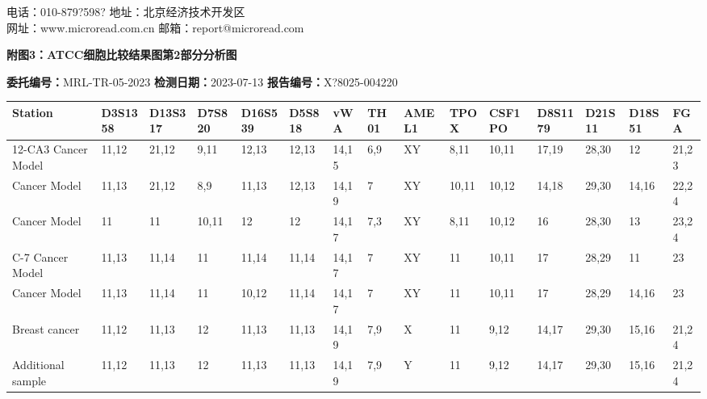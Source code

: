 \documentclass[UTF8,10pt,a4paper,fontset=fandol]{ctexart}
\begin{document}
\noindent 电话：010-879?598? \quad 地址：北京经济技术开发区\\
\noindent 网址：www.microread.com.cn \quad 邮箱：report@microread.com

\newpage

\begin{center}
\textbf{附图3：ATCC细胞比较结果图第2部分分析图}
\end{center}

\noindent
\textbf{委托编号：}MRL-TR-05-2023
\hfill
\textbf{检测日期：}2023-07-13
\hfill
\textbf{报告编号：}X?8025-004220

\medskip

\begin{center}
\scriptsize
\begin{tabular}{p{3.0cm}*{14}{p{0.72cm}}}
\hline
\textbf{Station}
& \textbf{D3S1358}
& \textbf{D13S317}
& \textbf{D7S820}
& \textbf{D16S539}
& \textbf{D5S818}
& \textbf{vWA}
& \textbf{TH01}
& \textbf{AMEL1}
& \textbf{TPOX}
& \textbf{CSF1PO}
& \textbf{D8S1179}
& \textbf{D21S11}
& \textbf{D18S51}
& \textbf{FGA}
\\
\hline
12-CA3 Cancer Model
& 11,12 & 21,12 & 9,11 & 12,13 & 12,13
& 14,15 & 6,9 & XY & 8,11 & 10,11
& 17,19 & 28,30 & 12 & 21,23
\\
\multicolumn{1}{p{3.0cm}}{Cancer Model}
& 11,13 & 21,12 & 8,9 & 11,13 & 12,13
& 14,19 & 7 & XY & 10,11 & 10,12
& 14,18 & 29,30 & 14,16 & 22,24
\\
\multicolumn{1}{p{3.0cm}}{Cancer Model}
& 11 & 11 & 10,11 & 12 & 12
& 14,17 & 7,3 & XY & 8,11 & 10,12
& 16 & 28,30 & 13 & 23,24
\\
\multicolumn{1}{p{3.0cm}}{C-7 Cancer Model}
& 11,13 & 11,14 & 11 & 11,14 & 11,14
& 14,17 & 7 & XY & 11 & 10,11
& 17 & 28,29 & 11 & 23
\\
\multicolumn{1}{p{3.0cm}}{Cancer Model}
& 11,13 & 11,14 & 11 & 10,12 & 11,14
& 14,17 & 7 & XY & 11 & 10,11
& 17 & 28,29 & 14,16 & 23
\\
\multicolumn{1}{p{3.0cm}}{Breast cancer}
& 11,12 & 11,13 & 12 & 11,13 & 11,13
& 14,19 & 7,9 & X & 11 & 9,12
& 14,17 & 29,30 & 15,16 & 21,24
\\
\multicolumn{1}{p{3.0cm}}{Additional sample}
& 11,12 & 11,13 & 12 & 11,13 & 11,13
& 14,19 & 7,9 & Y & 11 & 9,12
& 14,17 & 29,30 & 15,16 & 21,24
\\
\hline
\end{tabular}
\end{center}

\medskip
\end{document}
